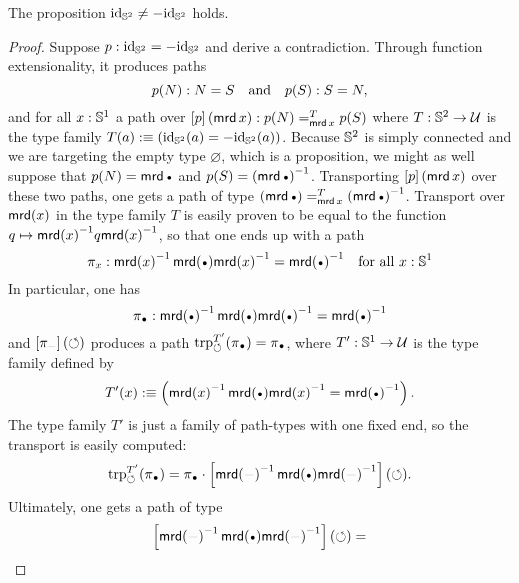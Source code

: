 \documentclass[english,a4]{article}
\renewcommand{\ap}[1]{\left[{#1}\right]}
\begin{document}
\begin{lemma}
  \label{lemma:S2-id-neq-minusid}%
  The proposition $\mathord{\mathrm{id}}_{{\mathbb S^{2}}} \neq -\mathord{\mathrm{id}}_{{\mathbb S^{2}}}$ holds.
\end{lemma}
\begin{proof}
  Suppose $p:\mathord{\mathrm{id}}_{{\mathbb S^{2}}} = -\mathord{\mathrm{id}}_{{\mathbb S^{2}}}$ and derive a contradiction. Through
  function extensionality, it produces paths
  \begin{displaymath}
    p(N) : N = S
    \quad\text{and}\quad
    p(S) : S = N,
  \end{displaymath}
  and for all $x:{{\mathbb S^{1}}}$ a path over
  $\ap p (\mrd x)\from \pathover {p(N)} T {\mrd x} {p(S)}$ where
  $T: {{\mathbb S^{2}}} \to \mathcal{U}$ is the type family
  $T(a)\mathrel{\hbox{:}\mkern-5mu\equiv} (\mathord{\mathrm{id}}_{{\mathbb S^{2}}}(a) = -\mathord{\mathrm{id}}_{{\mathbb S^{2}}}(a))$. Because ${{\mathbb S^{2}}}$ is simply
  connected and we are targeting the empty type $\varnothing$, which
  is a proposition, we might as well suppose that $p(N)=\mrd \base$
  and $p(S) = \inv{(\mrd \base)}$. Transporting $\ap p(\mrd x)$ over
  these two paths, one gets a path of type
  $\pathover {(\mrd \base)} T {\mrd x} {\inv{(\mrd
      \base)}}$. Transport over $\operatorname{\mathsf{mrd}}(x)$ in the type family $T$ is
  easily proven to be equal to the function
  $q \mapsto {\operatorname{\mathsf{mrd}}(x)}^{-1} q {\operatorname{\mathsf{mrd}}(x)}^{-1}$, so that one
  ends up with a path
  \begin{displaymath}
    \pi_x\from \inv{\mrd(x)} \mrd(\base) \inv{\mrd(x)} = \inv{\mrd(\base)}
    \quad
    \text{for all }x\from\Sc
  \end{displaymath}
  In particular, one has
  \begin{displaymath}
    \pi_{\base} \from \inv{\mrd(\base)} \mrd(\base) \inv{\mrd(\base)}
    = \inv{\mrd(\base)}
  \end{displaymath}
  and $\ap {\pi_{\blank}} (\Sloop)$ produces a path
  $\trp [T'] \Sloop (\pi_{\base}) = \pi_{\base}$, where $T':{{\mathbb S^{1}}}\to\mathcal{U}$
  is the type family defined by
  \begin{displaymath}
    T'(x) \defequi \left(\inv{\mrd(x)}\mrd(\base)\inv{\mrd(x)}
      = \inv{\mrd(\base)} \right).
  \end{displaymath}
  The type family $T'$ is just a family of path-types with one fixed
  end, so the transport is easily computed:
  \begin{displaymath}
    \trp [T'] \Sloop (\pi_{\base}) = \pi_{\base} \cdot
    \ap{\inv{\mrd(\blank)} \mrd(\base) \inv{\mrd(\blank)}}(\Sloop).
  \end{displaymath}
  Ultimately, one gets a path of type
  \begin{displaymath}
    \ap{\inv{\mrd(\blank)} \mrd(\base) \inv{\mrd(\blank)}}(\Sloop) =

\end{displaymath}
\end{proof}
\end{document}
